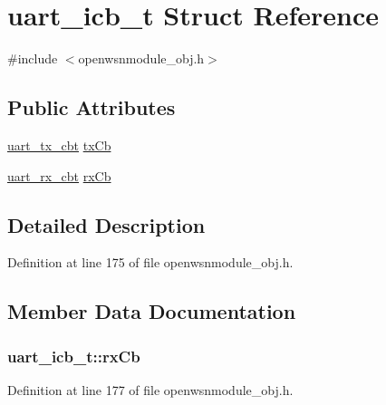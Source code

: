 \hypertarget{structuart__icb__t}{}\section{uart\+\_\+icb\+\_\+t Struct Reference}
\label{structuart__icb__t}


{\ttfamily \#include $<$openwsnmodule\+\_\+obj.\+h$>$}

\subsection*{Public Attributes}
\begin{DoxyCompactItemize}
\item 
\hyperlink{group__uart_gae005b96f0b18aecb814f4979c3e33408}{uart\+\_\+tx\+\_\+cbt} \hyperlink{structuart__icb__t_a57ddc50d1f6a8d5d7f59233b074b0123}{tx\+Cb}
\item 
\hyperlink{group__uart_gab8f8d6449d6a994dfb5ede3fca7ac4e2}{uart\+\_\+rx\+\_\+cbt} \hyperlink{structuart__icb__t_a4d31e0e45e9809669c4b0cfa306c9d5c}{rx\+Cb}
\end{DoxyCompactItemize}


\subsection{Detailed Description}


Definition at line 175 of file openwsnmodule\+\_\+obj.\+h.



\subsection{Member Data Documentation}
\subsubsection[{\texorpdfstring{rx\+Cb}{rxCb}}]{ uart\+\_\+icb\+\_\+t\+::rx\+Cb}\hypertarget{structuart__icb__t_a4d31e0e45e9809669c4b0cfa306c9d5c}{}\label{structuart__icb__t_a4d31e0e45e9809669c4b0cfa306c9d5c}


Definition at line 177 of file openwsnmodule\+\_\+obj.\+h.

